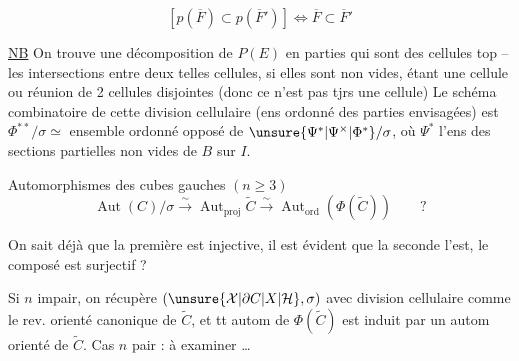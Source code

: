 \[
[p(\overline F)\subset p(\overline F')]\Longleftrightarrow\overline F\subset\overline F'
\]


\uline{NB} On trouve une décomposition de $P(E)$  en parties qui sont des cellules top -- les intersections entre deux telles cellules, si elles sont non vides, étant une cellule ou réunion de 2 cellules disjointes (donc ce n'est pas tjrs une cellule) Le schéma combinatoire de cette division cellulaire (ens ordonné des parties envisagées) est  $\Phi^{**}/\sigma\simeq$ ensemble ordonné opposé de $\unsure{\Psi^*|\Psi^\times|\Phi^*}/\sigma$, où $\Psi^*$  l'ens des sections partielles non vides de $B$ sur $I$.

Automorphismes des cubes gauches $(n\geq3)$
\[
\operatorname{Aut}(C)/\sigma\xrightarrow{\sim}\operatorname{Aut}_{\mathrm{proj}}\widetilde C\xrightarrow{\sim}\operatorname{Aut}_{\mathrm{ord}}(\Phi(\widetilde C))\qquad ?
\]

On sait déjà que la première  est injective, il est évident que la seconde l'est, le composé  est  surjectif ?

Si $n$ impair, on récupère $(\unsure{\mathcal X|\partial C|X|\mathcal H},\sigma)$ avec division cellulaire comme le rev. orienté canonique de $\widetilde C$, et tt autom de $\Phi(\widetilde C)$ est induit par un autom orienté de $\widetilde C$. Cas $n$ pair : à examiner \ldots
